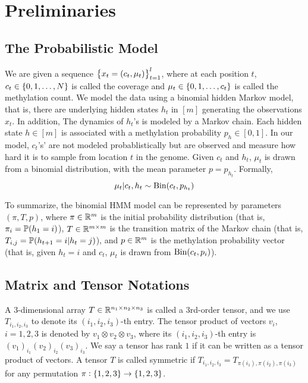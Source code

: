 \section{Preliminaries}

\subsection{The Probabilistic Model}

We are given a sequence $\cbr{x_t = (c_t, \mu_t)}_{t=1}^l$, where at each position $t$, $c_t \in \cbr{0,1,\ldots,N}$ is called the coverage and $\mu_t \in \cbr{0,1,\ldots,c_t}$ is called the methylation count. We model the data using a binomial hidden Markov model, that is, there are underlying hidden states $h_t$ in $[m]$ generating the observations $x_t$. In addition, The dynamics of $h_t$'s is modeled by a Markov chain. Each hidden state $h \in [m]$ is associated with a methylation probability $p_h \in [0,1]$.
In our model, $c_t$'s' are not modeled probablistically  but are observed and measure how hard it is to sample from location $t$ in the genome.
Given $c_t$ and $h_t$, $\mu_t$ is drawn from a binomial distribution, with the mean parameter $p = p_{h_t}$.
Formally,
\[ \mu_t | c_t, h_t \sim \bin(c_t, p_{h_t}) \]

To summarize, the binomial HMM model can be represented by parameters $(\pi, T, p)$, where $\pi \in \R^m$ is the initial probability distribution (that is, $\pi_i = \P(h_1 = i)$), $T \in \R^{m \times m}$ is the transition matrix of the Markov chain (that is, $T_{i,j} = \P(h_{t+1} = i | h_t = j)$), and $p \in \R^m$ is the methylation probability vector (that is, given $h_t = i$ and $c_t$, $\mu_t$ is drawn from $\bin(c_t, p_i)$).

\subsection{Matrix and Tensor Notations}
A $3$-dimensional array $T \in \R^{n_1 \times n_2 \times n_3}$ is called a 3rd-order tensor, and we use $T_{i_1, i_2, i_3}$ to denote its $(i_1, i_2, i_3)$-th entry. The tensor product of vectors $v_i$, $i = 1, 2, 3$ is denoted by $v_1 \otimes v_2 \otimes v_3$, where its
$(i_1, i_2, i_3)$-th entry is $(v_1)_{i_1} (v_2)_{i_2} (v_3)_{i_3}$. We say a tensor has rank $1$ if it can be
written as a tensor product of vectors. A tensor $T$ is called symmetric if $T_{i_1, i_2, i_3} = T_{\pi(i_1), \pi(i_2), \pi(i_3)}$ for any permutation $\pi: \cbr{1,2,3} \to \cbr{1,2,3}$.

